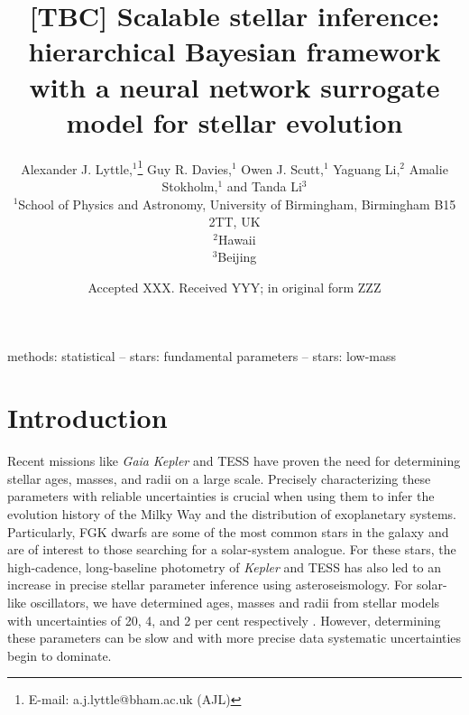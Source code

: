 \documentclass[fleqn,usenatbib]{mnras}
\title[Scalable stellar inference]{[TBC] Scalable stellar inference: hierarchical Bayesian framework with a neural network surrogate model for stellar evolution}
\author[A. J. Lyttle et al.]{
Alexander J. Lyttle,$^{1}$\thanks{E-mail: a.j.lyttle@bham.ac.uk (AJL)}
Guy R. Davies,$^{1}$
Owen J. Scutt,$^{1}$
Yaguang Li,$^{2}$
Amalie Stokholm,$^{1}$
and Tanda Li$^{3}$
\\
$^{1}$School of Physics and Astronomy, University of Birmingham, Birmingham B15 2TT, UK\\
$^{2}$Hawaii\\
$^{3}$Beijing
}
\date{Accepted XXX. Received YYY; in original form ZZZ}
\begin{document}
\label{firstpage}
\pagerange{\pageref{firstpage}--\pageref{lastpage}}
\maketitle

\begin{abstract}

\end{abstract}

\begin{keywords}
methods: statistical -- stars: fundamental parameters -- stars: low-mass
\end{keywords}



\section{Introduction}

Recent missions like \emph{Gaia} \citep{GaiaCollaboration.Prusti.ea2016,GaiaCollaboration.Brown.ea2018} \emph{Kepler} \citep{Borucki.Koch.ea2010} and TESS \citep{Ricker.Winn.ea2015} have proven the need for determining stellar ages, masses, and radii on a large scale. Precisely characterizing these parameters with reliable uncertainties is crucial when using them to infer the evolution history of the Milky Way and the distribution of exoplanetary systems. Particularly, FGK dwarfs are some of the most common stars in the galaxy and are of interest to those searching for a solar-system analogue. For these stars, the high-cadence, long-baseline photometry of \emph{Kepler} and TESS has also led to an increase in precise stellar parameter inference using asteroseismology. For solar-like oscillators, we have determined ages, masses and radii from stellar models with uncertainties of 20, 4, and 2 per cent respectively \citep[citation needed][]{}. However, determining these parameters can be slow and with more precise data systematic uncertainties begin to dominate.

\end{document}
